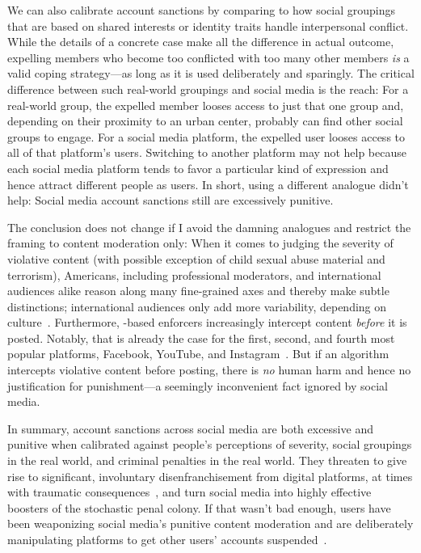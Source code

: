 We can also calibrate account sanctions by comparing to how social groupings
that are based on shared interests or identity traits handle interpersonal
conflict. While the details of a concrete case make all the difference in actual
outcome, expelling members who become too conflicted with too many other members
\emph{is} a valid coping strategy---as long as it is used deliberately and
sparingly. The critical difference between such real-world groupings and social
media is the reach: For a real-world group, the expelled member looses access to
just that one group and, depending on their proximity to an urban center,
probably can find other social groups to engage. For a social media platform,
the expelled user looses access to all of that platform's users. Switching to
another platform may not help because each social media platform tends to favor
a particular kind of expression and hence attract different people as users. In
short, using a different analogue didn't help: Social media account sanctions
still are excessively punitive.

The conclusion does not change if I avoid the damning analogues and restrict
the framing to content moderation only: When it comes to judging the severity of
violative content (with possible exception of child sexual abuse material and
terrorism), Americans, including professional moderators, and international
audiences alike reason along many fine-grained axes and thereby make subtle
distinctions; international audiences only add more variability, depending on
culture~\cite{JiangScheuermanea2021,ScheuermanJiangea2021}. Furthermore,
-based enforcers increasingly intercept content \emph{before} it is posted.
Notably, that is already the case for the first, second, and fourth most popular
platforms, Facebook, YouTube, and Instagram~\cite{Lua2022}. But if an algorithm
intercepts violative content before posting, there is \emph{no} human harm and
hence no justification for punishment---a seemingly inconvenient fact ignored
by social media.

In summary, account sanctions across social media are both excessive and
punitive when calibrated against people's perceptions of severity, social
groupings in the real world, and criminal penalties in the real world. They
threaten to give rise to significant, involuntary disenfranchisement from
digital platforms, at times with traumatic consequences~\cite{Hill2022}, and
turn social media into highly effective boosters of the stochastic penal colony.
If that wasn't bad enough, users have been weaponizing social media's punitive
content moderation and are deliberately manipulating platforms to get other
users' accounts suspended~\cite{SilvermanFortis2023}.

